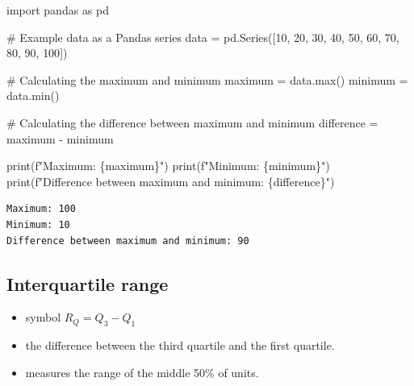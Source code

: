 \documentclass[
  english,
  letterpaper,
  DIV=11,
  numbers=noendperiod]{scrreprt}
\newenvironment{Shaded}{\begin{snugshade}}{\end{snugshade}}
\newcommand{\BuiltInTok}[1]{\textcolor[rgb]{0.00,0.23,0.31}{#1}}
\newcommand{\CommentTok}[1]{\textcolor[rgb]{0.37,0.37,0.37}{#1}}
\newcommand{\DecValTok}[1]{\textcolor[rgb]{0.68,0.00,0.00}{#1}}
\newcommand{\ImportTok}[1]{\textcolor[rgb]{0.00,0.46,0.62}{#1}}
\newcommand{\NormalTok}[1]{\textcolor[rgb]{0.00,0.23,0.31}{#1}}
\newcommand{\OperatorTok}[1]{\textcolor[rgb]{0.37,0.37,0.37}{#1}}
\newcommand{\SpecialCharTok}[1]{\textcolor[rgb]{0.37,0.37,0.37}{#1}}
\newcommand{\SpecialStringTok}[1]{\textcolor[rgb]{0.13,0.47,0.30}{#1}}
\providecommand{\tightlist}{%
  \setlength{\itemsep}{0pt}\setlength{\parskip}{0pt}}
\begin{document}
\begin{Shaded}
\begin{Highlighting}[]
\ImportTok{import}\NormalTok{ pandas }\ImportTok{as}\NormalTok{ pd}

\CommentTok{\# Example data as a Pandas series}
\NormalTok{data }\OperatorTok{=}\NormalTok{ pd.Series([}\DecValTok{10}\NormalTok{, }\DecValTok{20}\NormalTok{, }\DecValTok{30}\NormalTok{, }\DecValTok{40}\NormalTok{, }\DecValTok{50}\NormalTok{, }\DecValTok{60}\NormalTok{, }\DecValTok{70}\NormalTok{, }\DecValTok{80}\NormalTok{, }\DecValTok{90}\NormalTok{, }\DecValTok{100}\NormalTok{])}

\CommentTok{\# Calculating the maximum and minimum}
\NormalTok{maximum }\OperatorTok{=}\NormalTok{ data.}\BuiltInTok{max}\NormalTok{()}
\NormalTok{minimum }\OperatorTok{=}\NormalTok{ data.}\BuiltInTok{min}\NormalTok{()}

\CommentTok{\# Calculating the difference between maximum and minimum}
\NormalTok{difference }\OperatorTok{=}\NormalTok{ maximum }\OperatorTok{{-}}\NormalTok{ minimum}

\BuiltInTok{print}\NormalTok{(}\SpecialStringTok{f"Maximum: }\SpecialCharTok{\{}\NormalTok{maximum}\SpecialCharTok{\}}\SpecialStringTok{"}\NormalTok{)}
\BuiltInTok{print}\NormalTok{(}\SpecialStringTok{f"Minimum: }\SpecialCharTok{\{}\NormalTok{minimum}\SpecialCharTok{\}}\SpecialStringTok{"}\NormalTok{)}
\BuiltInTok{print}\NormalTok{(}\SpecialStringTok{f"Difference between maximum and minimum: }\SpecialCharTok{\{}\NormalTok{difference}\SpecialCharTok{\}}\SpecialStringTok{"}\NormalTok{)}
\end{Highlighting}
\end{Shaded}

\begin{verbatim}
Maximum: 100
Minimum: 10
Difference between maximum and minimum: 90
\end{verbatim}

\subsection{Interquartile range}\label{interquartile-range}

\begin{itemize}
\tightlist
\item
  symbol \(R_Q=Q_3-Q_1\)
\item
  the difference between the third quartile and the first quartile.
\item
  measures the range of the middle 50\% of units.
\end{itemize}
\end{document}
